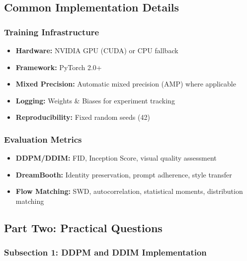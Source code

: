 \documentclass[a4paper,12pt]{article}
\begin{document}
\subsection{Common Implementation Details}

\subsubsection{Training Infrastructure}
\begin{itemize}
    \item \textbf{Hardware:} NVIDIA GPU (CUDA) or CPU fallback
    \item \textbf{Framework:} PyTorch 2.0+
    \item \textbf{Mixed Precision:} Automatic mixed precision (AMP) where applicable
    \item \textbf{Logging:} Weights \& Biases for experiment tracking
    \item \textbf{Reproducibility:} Fixed random seeds (42)
\end{itemize}

\subsubsection{Evaluation Metrics}
\begin{itemize}
    \item \textbf{DDPM/DDIM:} FID, Inception Score, visual quality assessment
    \item \textbf{DreamBooth:} Identity preservation, prompt adherence, style transfer
    \item \textbf{Flow Matching:} SWD, autocorrelation, statistical moments, distribution matching
\end{itemize}

\newpage

\subsection{Part Two: Practical Questions}

\subsubsection{Subsection 1: DDPM and DDIM Implementation}
\end{document}
